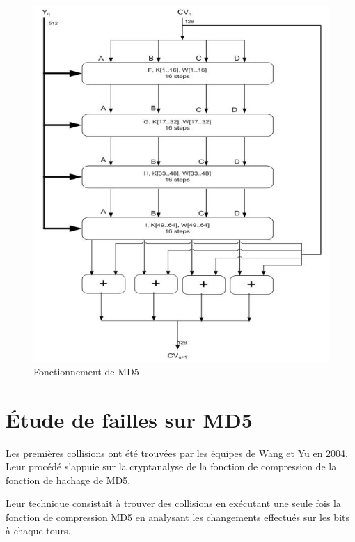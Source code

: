 \begin{figure}[h!]
  \includegraphics[scale=.61]{./images/md5process.png}
  \caption{Fonctionnement de MD5}
\end{figure}


\section{Étude de failles sur MD5}

Les premières collisions ont été trouvées par les équipes de Wang et Yu en 2004.  Leur procédé s'appuie sur la cryptanalyse de la fonction de compression de la fonction de hachage de MD5. 

Leur technique consistait à trouver des collisions en exécutant une seule fois la fonction de compression MD5 en analysant les changements effectués sur les bits à chaque tours.

